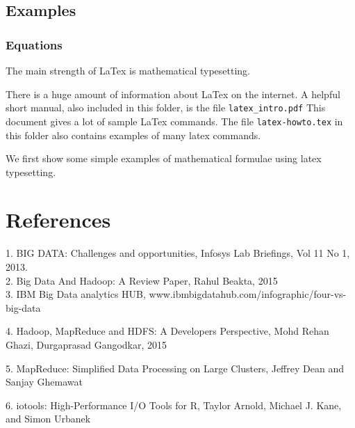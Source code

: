 \documentclass[11pt]{book}
\begin{document}
\section{Examples}







\subsection{Equations}
The main strength of LaTex is  mathematical typesetting.  

There is a huge amount of information about LaTex on the internet.
A helpful short manual, also included in this folder, is the file
\verb+latex_intro.pdf+
This document gives a lot of sample LaTex commands.  
The file \verb+latex-howto.tex+ in this folder also contains examples of many latex commands.




We first show  some simple examples of 
mathematical formulae using latex typesetting.





\chapter{References}
1. BIG DATA: Challenges and opportunities, Infosys Lab Briefings,
Vol 11 No 1, 2013. \\

2. Big Data And Hadoop: A Review Paper, Rahul Beakta, 2015 \\

 3. IBM Big Data analytics HUB,
www.ibmbigdatahub.com/infographic/four-vs-big-data

4. Hadoop, MapReduce and HDFS: A Developers Perspective, 
Mohd Rehan Ghazi, Durgaprasad Gangodkar, 2015

5. MapReduce: Simplified Data Processing on Large Clusters, 
Jeffrey Dean and Sanjay Ghemawat

6. iotools: High-Performance I/O Tools for R, 
Taylor Arnold, Michael J. Kane, and Simon Urbanek
\end{document}
